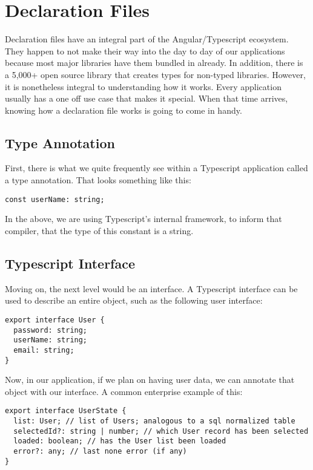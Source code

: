 \chapter{Declaration Files}
Declaration files have an integral part of the Angular/Typescript ecosystem. They happen to not make their way into the day to day of our applications because most major libraries have them bundled in already. In addition, there is a 5,000+ open source library that creates types for non-typed libraries. However, it is nonetheless integral to understanding how it works. Every application usually has a one off use case that makes it special. When that time arrives, knowing how a declaration file works is going to come in handy.

\section{Type Annotation}
First, there is what we quite frequently see within a Typescript application called a type annotation. That looks something like this: 
\begin{verbatim}
const userName: string;  
\end{verbatim}

In the above, we are using Typescript's internal framework, to inform that compiler, that the type of this constant is a string. 

\section{Typescript Interface}
Moving on, the next level would be an interface. A Typescript interface can be used to describe an entire object, such as the following user interface: 
\begin{lstlisting}[caption=Typescript User Interface]
export interface User {
  password: string;
  userName: string;
  email: string;
}
\end{lstlisting}

Now, in our application, if we plan on having user data, we can annotate that object with our interface. A common enterprise example of this: 
\begin{lstlisting}[caption=user.reducer.ts]
export interface UserState {
  list: User; // list of Users; analogous to a sql normalized table
  selectedId?: string | number; // which User record has been selected
  loaded: boolean; // has the User list been loaded
  error?: any; // last none error (if any)
}  
\end{lstlisting}

